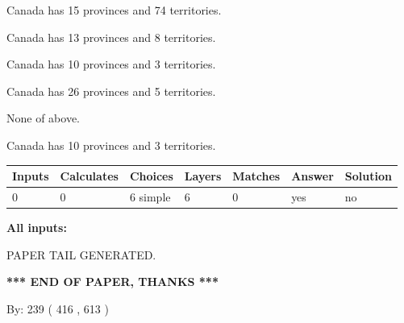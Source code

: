 \documentclass[12pt]{article}
\begin{document}
 
Canada has  15 provinces and  74 territories.
 
 
Canada has  13 provinces and  8 territories.
 
 
Canada has 10  provinces and 3 territories.
 
 
Canada has  26 provinces and  5 territories.
 
 
 None of above.
 
 
\noindent{}
 
 
Canada has 10  provinces and 3 territories.
 
 
\noindent{}
 
 
   
   
   
   
\noindent\begin{tabular}{|l|l|l|l|l|l|l|}
 \hline
Inputs & Calculates & Choices & Layers & Matches & Answer & Solution \\ \hline
 0  & 
 0  & 
 6
  simple  
  & 
 6  & 
 0  & 
  yes & 
  no 
  \\ \hline
 \end{tabular}
   
   
   
   
\noindent{}
   
   
   
   
\noindent\vspace{0.1in}\hspace{-0.08in} {\textbf{\Large{All inputs: }}}
   
   
   
   
   
   
 \vspace{0.2in}
 
   
   
\vspace{2.0in} PAPER TAIL GENERATED.
   
   
   
   
\vspace{1.0in} 
{\textbf{\large{ *** END OF PAPER, THANKS *** }}} 
   
   
\hspace{1.0in} By: 
 239 ( 416 ,  613 )
   
\end{document}
